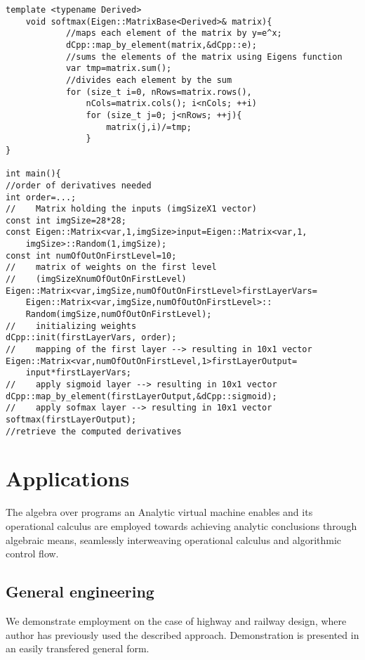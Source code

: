 \documentclass{article}
\begin{document}
\begin{lstlisting}
template <typename Derived>
    void softmax(Eigen::MatrixBase<Derived>& matrix){
            //maps each element of the matrix by y=e^x;
            dCpp::map_by_element(matrix,&dCpp::e);
            //sums the elements of the matrix using Eigens function
            var tmp=matrix.sum();
            //divides each element by the sum
            for (size_t i=0, nRows=matrix.rows(), 
            	nCols=matrix.cols(); i<nCols; ++i)
                for (size_t j=0; j<nRows; ++j){
                    matrix(j,i)/=tmp;
                }
}

int main(){
//order of derivatives needed
int order=...;
//    Matrix holding the inputs (imgSizeX1 vector)
const int imgSize=28*28;
const Eigen::Matrix<var,1,imgSize>input=Eigen::Matrix<var,1,
	imgSize>::Random(1,imgSize);
const int numOfOutOnFirstLevel=10;
//    matrix of weights on the first level 
//    (imgSizeXnumOfOutOnFirstLevel)
Eigen::Matrix<var,imgSize,numOfOutOnFirstLevel>firstLayerVars=
	Eigen::Matrix<var,imgSize,numOfOutOnFirstLevel>::
	Random(imgSize,numOfOutOnFirstLevel);
//    initializing weights
dCpp::init(firstLayerVars, order);
//    mapping of the first layer --> resulting in 10x1 vector
Eigen::Matrix<var,numOfOutOnFirstLevel,1>firstLayerOutput=
	input*firstLayerVars;
//    apply sigmoid layer --> resulting in 10x1 vector
dCpp::map_by_element(firstLayerOutput,&dCpp::sigmoid);
//    apply sofmax layer --> resulting in 10x1 vector
softmax(firstLayerOutput);
//retrieve the computed derivatives
\end{lstlisting}

\section{Applications}\label{sec:Employment}

The algebra over programs \cite[Theorem~5.3]{OperationalCalculus} an Analytic virtual machine enables and its operational calculus are employed towards achieving analytic conclusions through algebraic means, seamlessly interweaving operational calculus and algorithmic control flow. 

\subsection{General engineering}\label{sec:generalEngineering}

We demonstrate employment on the case of highway and railway design, where author has previously used the described approach. Demonstration is presented in an easily transfered general form.
\end{document}
